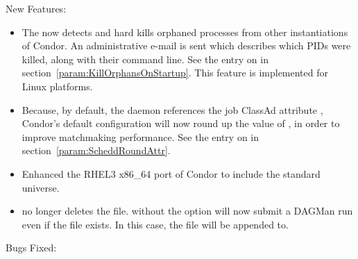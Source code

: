 \noindent New Features:

\begin{itemize}

\item The  now detects  and hard kills orphaned processes
from other
instantiations of Condor. An administrative e-mail
is sent which describes which PIDs were killed, along with their command
line. See the entry on  in 
section~\ref{param:KillOrphansOnStartup}.
This feature is implemented for Linux platforms.

\item Because, by default, the  daemon references the job
ClassAd attribute , Condor's default configuration
will now round up the value of , in order to improve 
matchmaking performance.  See the entry on 
in section~\ref{param:ScheddRoundAttr}.

\item Enhanced the RHEL3 x86\_64 port of Condor to include the standard
universe.

\item {}  no longer deletes the
 file.   without the 
option will now submit a DAGMan run even if the 
file exists.  In this case, the file will be appended to.

\end{itemize}

\noindent Bugs Fixed:

